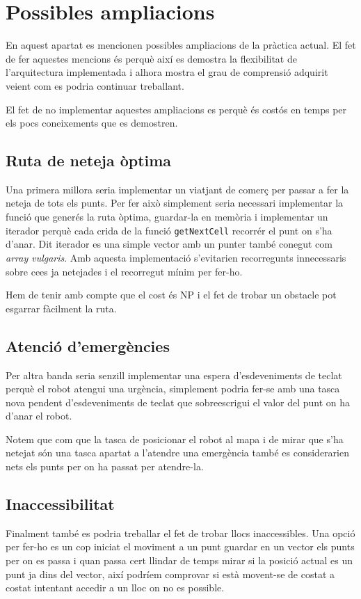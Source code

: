 \section{Possibles ampliacions}

En aquest apartat es mencionen possibles ampliacions de la pràctica actual. El fet de fer aquestes mencions
és perquè així es demostra la flexibilitat de l'arquitectura implementada i alhora mostra el grau
de comprensió adquirit veient com es podria continuar treballant.

El fet de no implementar aquestes ampliacions es perquè és costós en temps per els pocs coneixements
que es demostren.

\subsection{Ruta de neteja òptima}
Una primera millora seria implementar un viatjant de comerç per passar a fer la neteja de tots els punts.
Per fer això simplement seria necessari implementar la funció que generés la ruta òptima, guardar-la en 
memòria i implementar un iterador perquè cada crida de la funció \texttt{getNextCell} recorrér el punt on s'ha d'anar.
Dit iterador es una simple vector amb un punter també conegut com \emph{array vulgaris}.
Amb aquesta implementació s'evitarien recorregunts innecessaris sobre ce\lgem es ja netejades i el recorregut
mínim per fer-ho.

Hem de tenir amb compte que el cost és NP i el fet de trobar un obstacle pot esgarrar fàcilment la ruta.

\subsection{Atenció d'emergències}
Per altra banda seria senzill implementar una espera d'esdeveniments de teclat perquè el robot atengui una urgència,
simplement podria fer-se amb una tasca nova pendent d'esdeveniments de teclat que sobreescrigui el valor del  punt
on ha d'anar el robot.

Notem que com que la tasca de posicionar el robot al mapa i de mirar que s'ha netejat són una tasca apartat
a l'atendre una emergència també es considerarien nets els punts per on ha passat per atendre-la.

\subsection{Inaccessibilitat}
Finalment també es podria treballar el fet de trobar llocs inaccessibles. Una opció per fer-ho
es un cop iniciat el moviment a un punt guardar en un vector els punts per on es passa i quan passa
cert llindar de temps mirar si la posició actual es un punt ja dins del vector, així podríem comprovar
si està movent-se de costat a costat intentant accedir a un lloc on no es possible.

